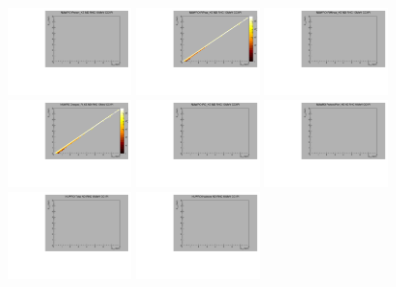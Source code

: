 \begin{center}

  \includegraphics[width=0.245\textwidth]{plots/response_matrix/Proton_KE_RHC_CC1Pi_10MeV.pdf}
  \includegraphics[width=0.245\textwidth]{plots/response_matrix/PiPlus_KE_RHC_CC1Pi_10MeV.pdf}
  \includegraphics[width=0.245\textwidth]{plots/response_matrix/PiMinus_KE_RHC_CC1Pi_10MeV.pdf}
  \includegraphics[width=0.245\textwidth]{plots/response_matrix/Charged_Pi_KE_RHC_CC1Pi_10MeV.pdf}
  \includegraphics[width=0.245\textwidth]{plots/response_matrix/Pi0_KE_RHC_CC1Pi_10MeV.pdf}
  \includegraphics[width=0.245\textwidth]{plots/response_matrix/Proton+Pion_KE_RHC_CC1Pi_10MeV.pdf}
  \includegraphics[width=0.245\textwidth]{plots/response_matrix/Total_RHC_CC1Pi_10MeV.pdf}
  \includegraphics[width=0.245\textwidth]{plots/response_matrix/Hadrons_RHC_CC1Pi_10MeV.pdf}

\end{center}

